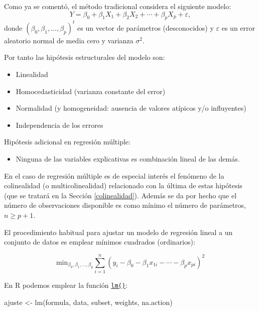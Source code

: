 \documentclass[
]{book}
\newenvironment{Shaded}{\begin{snugshade}}{\end{snugshade}}
\newcommand{\FunctionTok}[1]{\textcolor[rgb]{0.00,0.00,0.00}{#1}}
\newcommand{\NormalTok}[1]{#1}
\newcommand{\OtherTok}[1]{\textcolor[rgb]{0.56,0.35,0.01}{#1}}
\providecommand{\tightlist}{%
  \setlength{\itemsep}{0pt}\setlength{\parskip}{0pt}}
\theoremstyle{break}
\theoremstyle{nonumberplain}
\begin{document}
Como ya se comentó, el método tradicional considera el siguiente modelo:
\begin{equation} 
  Y = \beta_{0}+\beta_{1}X_{1}+\beta_{2}X_{2}+\cdots+\beta_{p}X_{p} + \varepsilon,
  \label{eq:modelo-rlm}
\end{equation}
donde \(\left( \beta_{0},\beta_{1},\ldots,\beta_{p}\right)^t\) es un vector de parámetros (desconocidos) y \(\varepsilon\) es un error aleatorio normal de media cero y varianza \(\sigma^2\).

Por tanto las hipótesis estructurales del modelo son:

\begin{itemize}
\item
  Linealidad
\item
  Homocedasticidad (varianza constante del error)
\item
  Normalidad (y homogeneidad: ausencia de valores atípicos y/o influyentes)
\item
  Independencia de los errores
\end{itemize}

Hipótesis adicional en regresión múltiple:

\begin{itemize}
\tightlist
\item
  Ninguna de las variables explicativas es combinación lineal de las demás.
\end{itemize}

En el caso de regresión múltiple es de especial interés el fenómeno de la colinealidad (o multicolinealidad) relacionado con la última de estas hipótesis (que se tratará en la Sección \ref{colinealidad}).
Además se da por hecho que el número de observaciones disponible es como mínimo el número de parámetros, \(n \geq p + 1\).

El procedimiento habitual para ajustar un modelo de regresión lineal a un conjunto de datos es emplear mínimos cuadrados (ordinarios):

\[\mbox{min}_{\beta_{0},\beta_{1},\ldots,\beta_{p}}  \sum\limits_{i=1}^{n}\left(  y_{i} - \beta_0 - \beta_1 x_{1i} - \cdots - \beta_p x_{pi} \right)^{2}\]

En R podemos emplear la función \href{https://rdrr.io/r/stats/lm.html}{\texttt{lm()}}:

\begin{Shaded}
\begin{Highlighting}[]
\NormalTok{ajuste }\OtherTok{\textless{}{-}} \FunctionTok{lm}\NormalTok{(formula, data, subset, weights, na.action)}
\end{Highlighting}
\end{Shaded}
\end{document}
